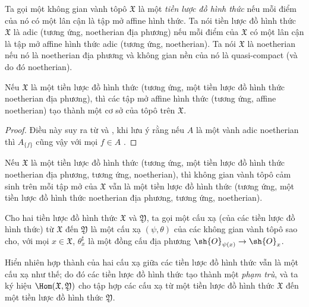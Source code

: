 \documentclass[oneside]{amsart}
\makeatletter
\newcommand{\ega@arrow}[2]{\mathchoice{#1}{#2}{#2}{#2}}
\renewcommand{\to}{\ega@arrow{\longrightarrow}{\rightarrow}}
\let\EGAOriginalLabel\label
\renewcommand{\label}[1]{\phantomsection\EGAOriginalLabel{#1}}
\makeatother
\begin{document}
\begin{definition}[10.4.2]
\label{I.10.4.2}
Ta gọi một không gian vành tôpô $\mathfrak{X}$ là một \emph{tiền lược đồ hình thức} nếu mỗi điểm của nó có một lân cận là tập mở affine hình thức.
Ta nói tiền lược đồ hình thức $\mathfrak{X}$ là adic (tương ứng, noetherian địa phương) nếu mỗi điểm của $\mathfrak{X}$ có một lân cận là tập mở affine hình thức adic (tương ứng, noetherian).
Ta nói $\mathfrak{X}$ là noetherian nếu nó là noetherian địa phương và không gian nền của nó là quasi-compact (và do đó noetherian).
\end{definition}

\begin{proposition}[10.4.3]
\label{I.10.4.3}
Nếu $\mathfrak{X}$ là một tiền lược đồ hình thức (tương ứng, một tiền lược đồ hình thức noetherian địa phương), thì các tập mở affine hình thức (tương ứng, affine noetherian) tạo thành một cơ sở của tôpô trên $\mathfrak{X}$.
\end{proposition}

\begin{proof}
Điều này suy ra từ  và , khi lưu ý rằng nếu $A$ là một vành adic noetherian thì $A_{\{f\}}$ cũng vậy với mọi $f\in A$ .
\end{proof}

\begin{corollary}[10.4.4]
\label{I.10.4.4}
Nếu $\mathfrak{X}$ là một tiền lược đồ hình thức (tương ứng, một tiền lược đồ hình thức noetherian địa phương, tương ứng, noetherian), thì không gian vành tôpô cảm sinh trên mỗi tập mở của $\mathfrak{X}$ vẫn là một tiền lược đồ hình thức (tương ứng, một tiền lược đồ hình thức noetherian địa phương, tương ứng, noetherian).
\end{corollary}

\begin{definition}[10.4.5]
\label{I.10.4.5}
Cho hai tiền lược đồ hình thức $\mathfrak{X}$ và $\mathfrak{Y}$, ta gọi một cấu xạ (của các tiền lược đồ hình thức) từ $\mathfrak{X}$ đến $\mathfrak{Y}$ là một cấu xạ $(\psi,\theta)$ của các không gian vành tôpô sao cho, với mọi $x\in\mathfrak{X}$, $\theta_x^\sharp$ là một đồng cấu địa phương $\sh{O}_{\psi(x)}\to\sh{O}_x$.
\end{definition}

Hiển nhiên hợp thành của hai cấu xạ giữa các tiền lược đồ hình thức vẫn là một cấu xạ như thế; do đó các tiền lược đồ hình thức tạo thành một \emph{phạm trù}, và ta ký hiệu $\Hom(\mathfrak{X},\mathfrak{Y})$ cho tập hợp các cấu xạ từ một tiền lược đồ hình thức $\mathfrak{X}$ đến một tiền lược đồ hình thức $\mathfrak{Y}$.
\end{document}
